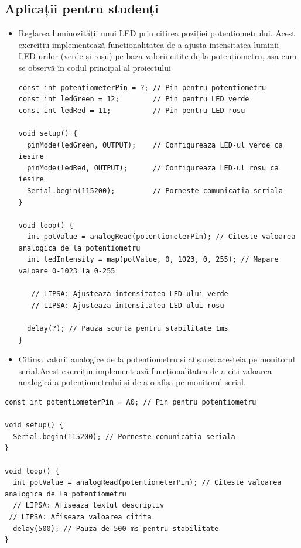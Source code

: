 \documentclass{report}
\begin{document}
\subsection*{Aplicații pentru studenți}
\begin{itemize}
    \item Reglarea luminozității unui LED prin citirea poziției potentiometrului.
    Acest exercițiu implementează funcționalitatea de a ajusta intensitatea luminii LED-urilor (verde și roșu) pe baza valorii citite de la potențiometru, așa cum se observă în codul principal al proiectului
    \begin{lstlisting}
const int potentiometerPin = ?; // Pin pentru potentiometru
const int ledGreen = 12;        // Pin pentru LED verde
const int ledRed = 11;          // Pin pentru LED rosu

void setup() {
  pinMode(ledGreen, OUTPUT);    // Configureaza LED-ul verde ca iesire
  pinMode(ledRed, OUTPUT);      // Configureaza LED-ul rosu ca iesire
  Serial.begin(115200);         // Porneste comunicatia seriala
}

void loop() {
  int potValue = analogRead(potentiometerPin); // Citeste valoarea analogica de la potentiometru
  int ledIntensity = map(potValue, 0, 1023, 0, 255); // Mapare valoare 0-1023 la 0-255

   // LIPSA: Ajusteaza intensitatea LED-ului verde
   // LIPSA: Ajusteaza intensitatea LED-ului rosu

  delay(?); // Pauza scurta pentru stabilitate 1ms
}

    \end{lstlisting}
    \newpage
    \vspace*{1cm}
    \item Citirea valorii analogice de la potentiometru și afișarea acesteia pe monitorul serial.Acest exercițiu implementează funcționalitatea de a citi valoarea analogică a potențiometrului și de a o afișa pe monitorul serial.
\end{itemize}
\begin{lstlisting}
const int potentiometerPin = A0; // Pin pentru potentiometru

void setup() {
  Serial.begin(115200); // Porneste comunicatia seriala
}

void loop() {
  int potValue = analogRead(potentiometerPin); // Citeste valoarea analogica de la potentiometru
  // LIPSA: Afiseaza textul descriptiv
 // LIPSA: Afiseaza valoarea citita
  delay(500); // Pauza de 500 ms pentru stabilitate
}

\end{lstlisting}
\end{document}
